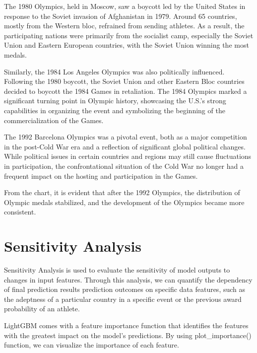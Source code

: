 \documentclass[12pt]{article}  %
\begin{document}
The 1980 Olympics, held in Moscow, saw a boycott led by the United States in response to the Soviet invasion of Afghanistan in 1979. Around 65 countries, mostly from the Western bloc, refrained from sending athletes. As a result, the participating nations were primarily from the socialist camp, especially the Soviet Union and Eastern European countries, with the Soviet Union winning the most medals.

Similarly, the 1984 Los Angeles Olympics was also politically influenced. Following the 1980 boycott, the Soviet Union and other Eastern Bloc countries decided to boycott the 1984 Games in retaliation. The 1984 Olympics marked a significant turning point in Olympic history, showcasing the U.S.'s strong capabilities in organizing the event and symbolizing the beginning of the commercialization of the Games.

The 1992 Barcelona Olympics was a pivotal event, both as a major competition in the post-Cold War era and a reflection of significant global political changes. While political issues in certain countries and regions may still cause fluctuations in participation, the confrontational situation of the Cold War no longer had a frequent impact on the hosting and participation in the Games.

From the chart, it is evident that after the 1992 Olympics, the distribution of Olympic medals stabilized, and the development of the Olympics became more consistent.



\section{Sensitivity Analysis}

Sensitivity Analysis is used to evaluate the sensitivity of model outputs to changes in input features. Through this analysis, we can quantify the dependency of final prediction results prediction outcomes on specific data features, such as the adeptness of a particular country in a specific event or the previous award probability of an athlete.

LightGBM comes with a feature importance function that identifies the features with the greatest impact on the model’s predictions. By using plot\_importance() function, we can visualize the importance of each feature.
\end{document}
